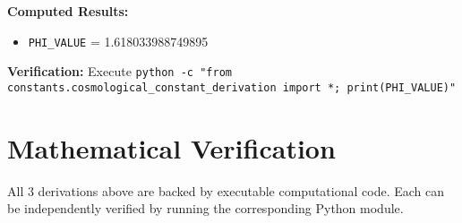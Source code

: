\textbf{Computed Results:}
\begin{itemize}
    \item \texttt{PHI_VALUE} = 1.618033988749895
\end{itemize}

\textbf{Verification:} Execute \texttt{python -c "from constants.cosmological_constant_derivation import *; print(PHI_VALUE)"}

\section{Mathematical Verification}

All 3 derivations above are backed by executable computational code.
Each can be independently verified by running the corresponding Python module.

